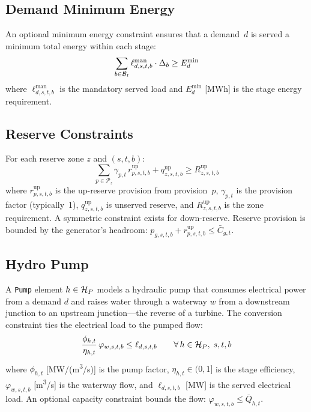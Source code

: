 \subsection{Demand Minimum Energy}

An optional minimum energy constraint ensures that a demand~$d$ is
served a minimum total energy within each stage:
\begin{equation}
\label{eq:min_energy}
\sum_{b \in \mathcal{B}_t} \ell^\text{man}_{d,s,t,b} \cdot \Delta_b
  \geq E_d^\text{min}
\end{equation}
where $\ell^\text{man}_{d,s,t,b}$ is the mandatory served load and
$E_d^\text{min}$ [MWh] is the stage energy requirement.

\subsection{Reserve Constraints}
\label{sec:reserve}

For each reserve zone $z$ and $(s,t,b)$:
\begin{equation}
\label{eq:reserve_up}
\sum_{p \in \mathcal{P}_z} \gamma_{p,t} \, r^\text{up}_{p,s,t,b}
  + q^\text{up}_{z,s,t,b}
  \geq R^\text{up}_{z,s,t,b}
\end{equation}
where $r^\text{up}_{p,s,t,b}$ is the up-reserve provision from
provision~$p$, $\gamma_{p,t}$ is the provision factor (typically~1),
$q^\text{up}_{z,s,t,b}$ is unserved reserve, and
$R^\text{up}_{z,s,t,b}$ is the zone requirement.  A symmetric constraint
exists for down-reserve.  Reserve provision is bounded by the generator's
headroom: $p_{g,s,t,b} + r^\text{up}_{p,s,t,b} \leq \bar{C}_{g,t}$.

\subsection{Hydro Pump}
\label{sec:pump}

A \texttt{Pump} element $h \in \mathcal{H}_P$ models a hydraulic pump
that consumes electrical power from a demand $d$ and raises water
through a waterway $w$ from a downstream junction to an upstream
junction---the reverse of a turbine.  The conversion constraint ties
the electrical load to the pumped flow:
\begin{equation}
\label{eq:pump}
\frac{\phi_{h,t}}{\eta_{h,t}} \, \varphi_{w,s,t,b} \leq \ell_{d,s,t,b}
\qquad \forall\, h \in \mathcal{H}_P,\; s,t,b
\end{equation}
where $\phi_{h,t}$ [MW/(m\textsuperscript{3}/s)] is the pump factor,
$\eta_{h,t} \in (0,1]$ is the stage efficiency, $\varphi_{w,s,t,b}$
[m\textsuperscript{3}/s] is the waterway flow, and
$\ell_{d,s,t,b}$ [MW] is the served electrical load.  An optional
capacity constraint bounds the flow:
$\varphi_{w,s,t,b} \leq \overline{Q}_{h,t}$.

